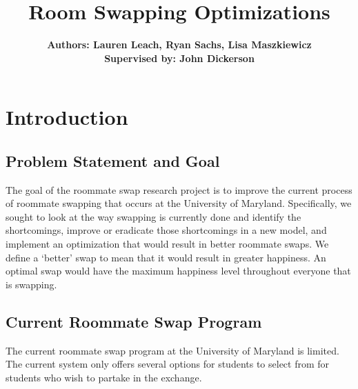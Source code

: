 \documentclass[12pt]{article}
\title{Room Swapping Optimizations}
\begin{document}
\maketitle

\begin{center}
\author{\textbf {Authors: Lauren Leach, Ryan Sachs, Lisa Maszkiewicz\\ \footnotesize Supervised by: John Dickerson\\ }} 
 

\begin{abstract}
\end{abstract}

\end{center}

\section{Introduction}
\subsection{Problem Statement and Goal}
The goal of the roommate swap research project is to improve the current process of roommate swapping that occurs at the University of Maryland. Specifically, we sought to look at the way swapping is currently done and identify the shortcomings, improve or eradicate those shortcomings in a new model, and implement an optimization that would result in better roommate swaps. We define a ‘better’ swap to mean that it would result in greater happiness. An optimal swap would have the maximum happiness level throughout everyone that is swapping.

\subsection{Current Roommate Swap Program}
The current roommate swap program at the University of Maryland is limited. The current system only offers several options for students to select from for students who wish to partake in the exchange. 
\end{document}
